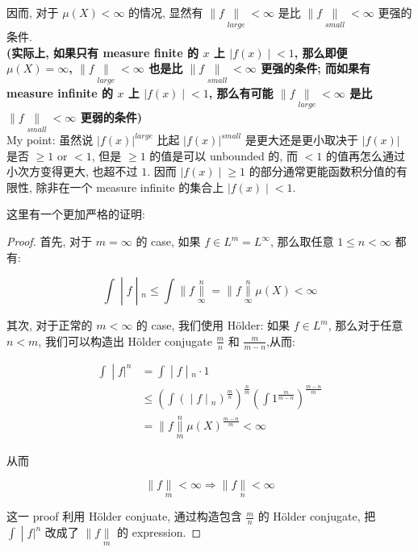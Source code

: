 \documentclass{qlnotes-export}
\begin{document}
因而, 对于 \(\mu(X) < \infty\) 的情况, 显然有 \(\parallel f\underset{large}{\parallel} < \infty\) 是比 \(\parallel f\underset{small}{\parallel} < \infty\) 更强的条件.\\
\textbf{(实际上, 如果只有 measure finite 的 \(x\) 上 \(\left. |f(x) \middle| < 1 \right.\), 那么即便 \(\mu(X) = \infty\), \(\parallel f\underset{large}{\parallel} < \infty\) 也是比 \(\parallel f\underset{small}{\parallel} < \infty\) 更强的条件; 而如果有 measure infinite 的 \(x\) 上 \(\left. |f(x) \middle| < 1 \right.\), 那么有可能 \(\parallel f\underset{large}{\parallel} < \infty\) 是比 \(\parallel f\underset{small}{\parallel} < \infty\) 更弱的条件)}\\
My point: 虽然说 \(|f(x)|^{large}\) 比起 \(|f(x)|^{small}\) 是更大还是更小取决于 \(|f(x)|\) 是否 \(\geq 1\) or \(< 1\), 但是 \(\geq 1\) 的值是可以 unbounded 的, 而 \(< 1\) 的值再怎么通过小次方变得更大, 也超不过 \(1\). 因而 \(\left. |f(x) \middle| \geq 1 \right.\) 的部分通常更能函数积分值的有限性, 除非在一个 measure infinite 的集合上 \(\left. |f(x) \middle| < 1 \right.\).

这里有一个更加严格的证明:

\begin{proof}

首先, 对于 \(m = \infty\) 的 case, 如果 \(f \in L^{m} = L^{\infty}\), 那么取任意 \(1 \leq n < \infty\) 都有:

\[\left. \int \middle| f \middle| {}_{n} \leq \int \parallel f\underset{\infty}{\overset{n}{\parallel}} = \parallel f\underset{\infty}{\overset{n}{\parallel}}\mu(X) < \infty \right.\]

其次, 对于正常的 \(m < \infty\) 的 case, 我们使用 Hölder: 如果 \(f \in L^{m}\), 那么对于任意 \(n < m\), 我们可以构造出 Hölder conjugate \(\frac{m}{n}\) 和 \(\frac{m}{m - n}\),从而:

\[\begin{matrix}
\left. \int \middle| f|^{n} \right. & \left. = \int \middle| f \middle| {}_{n} \cdot 1 \right. \\
 & \left. \leq (\int( \middle| f \middle| {}_{n})^{\frac{m}{n}})^{\frac{n}{m}}(\int 1^{\frac{m}{m - n}})^{\frac{m - n}{m}} \right. \\
 & {= \parallel f\underset{m}{\overset{n}{\parallel}}\mu(X)^{\frac{m - n}{m}} < \infty}
\end{matrix}\]

从而

\[\parallel f\underset{m}{\parallel} < \infty\Longrightarrow \parallel f\underset{n}{\parallel} < \infty\]

这一 proof 利用 Hölder conjuate, 通过构造包含 \(\frac{m}{n}\) 的 Hölder conjugate, 把 \(\left. \int \middle| f|^{n} \right.\) 改成了 \(\parallel f\underset{m}{\parallel}\) 的 expression.

\end{proof}
\end{document}
